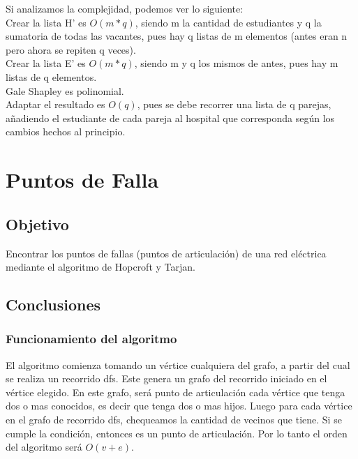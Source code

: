 \documentclass{article}
\begin{document}
                Si analizamos la complejidad, podemos ver lo siguiente: \\
                Crear la lista H' es $O(m*q)$, siendo m la cantidad de estudiantes y q la sumatoria de todas las vacantes,
                pues hay q listas de m elementos (antes eran n pero ahora se repiten q veces). \\
                Crear la lista E' es $O(m*q)$, siendo m y q los mismos de antes, pues hay m listas de q elementos. \\
                Gale Shapley es polinomial. \\
                Adaptar el resultado es $O(q)$, pues se debe recorrer una lista de q parejas, añadiendo el estudiante
                de cada pareja al hospital que corresponda según los cambios hechos al principio.

    \section{Puntos de Falla}
        \subsection{Objetivo}
            Encontrar los puntos de fallas (puntos de articulación) de una red eléctrica
            mediante el algoritmo de Hopcroft y Tarjan.
        \subsection{Conclusiones}
            \subsubsection{Funcionamiento del algoritmo}
                El algoritmo comienza tomando un vértice cualquiera del grafo, a partir
                del cual se realiza un recorrido dfs. Este genera un grafo del recorrido
                iniciado en el vértice elegido. En este grafo, será punto de articulación
                cada vértice que tenga dos o mas conocidos, es decir que tenga dos o mas
                hijos. Luego para cada vértice en el grafo de recorrido dfs, chequeamos
                la cantidad de vecinos que tiene. Si se cumple la condición, entonces es un punto
                de articulación. Por lo tanto el orden del algoritmo será $O(v+e)$.
\end{document}
